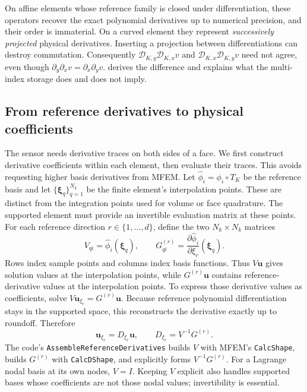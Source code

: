 On affine elements whose reference family is closed under differentiation,
these operators recover the exact polynomial derivatives up to numerical
precision, and their order is immaterial. On a curved element they represent
\emph{successively projected} physical derivatives. Inserting a projection
between differentiations can destroy commutation. Consequently
$\mathscr D_{K,y}\mathscr D_{K,x}v$ and
$\mathscr D_{K,x}\mathscr D_{K,y}v$ need not agree, even though
$\partial_y\partial_xv=\partial_x\partial_yv$.
 derives the difference and explains
what the multi-index storage does and does not imply.

\subsection{From reference derivatives to physical coefficients}
\label{sec:ofdg-coefficient-derivatives}

The sensor needs derivative traces on both sides of a face. We first
construct derivative coefficients within each element, then evaluate their
traces. This avoids requesting higher basis derivatives from MFEM.
Let $\widehat\phi_i=\phi_i\circ T_K$ be the reference basis and let
$\{\boldsymbol\xi_q\}_{q=1}^{N_k}$ be the finite element's interpolation
points. These are distinct from the integration points used for volume or
face quadrature. The supported element must provide an invertible evaluation
matrix at these points. For each reference direction $r\in\{1,\ldots,d\}$,
define the two $N_k\times N_k$ matrices
\begin{equation}
  V_{qi}=\widehat\phi_i(\boldsymbol{\xi}_q),
  \qquad
  G_{qi}^{(r)}
  =\frac{\partial\widehat\phi_i}{\partial\xi_r}(\boldsymbol{\xi}_q).
\end{equation}
Rows index sample points and columns index basis functions. Thus
$V\boldsymbol u$ gives solution values at the interpolation points, while
$G^{(r)}\boldsymbol u$ contains
reference-derivative values at the interpolation points.  To express those derivative values as coefficients, solve
$V\boldsymbol u_{\xi_r}=G^{(r)}\boldsymbol u$. Because reference
polynomial differentiation stays in the supported space, this reconstructs
the derivative exactly up to roundoff. Therefore
\begin{equation}
  \boldsymbol{u}_{\xi_r}=D_{\xi_r}\boldsymbol{u},
  \qquad
  D_{\xi_r}=V^{-1}G^{(r)}.
  \label{eq:ofdg-reference-derivative-matrix}
\end{equation}
The code's \texttt{AssembleReferenceDerivatives} builds $V$ with MFEM's
\texttt{CalcShape}, builds $G^{(r)}$ with \texttt{CalcDShape}, and
explicitly forms $V^{-1}G^{(r)}$. For a Lagrange nodal basis at its own nodes,
$V=I$. Keeping $V$ explicit also handles supported bases whose coefficients
are not those nodal values; invertibility is essential.

